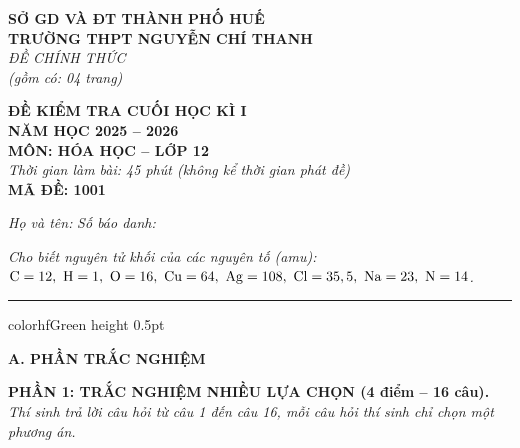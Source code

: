 \documentclass[11pt,a4paper]{article}
\begin{document}
\begin{minipage}[t]{0.48\textwidth}
\textbf{SỞ GD VÀ ĐT THÀNH PHỐ HUẾ}\\
\textbf{TRƯỜNG THPT NGUYỄN CHÍ THANH}\\
\textit{ĐỀ CHÍNH THỨC}\\
\textit{(gồm có: 04 trang)}
\end{minipage}
\hfill
\begin{minipage}[t]{0.48\textwidth}
\raggedleft
\textbf{\color{hfRed}ĐỀ KIỂM TRA CUỐI HỌC KÌ I}\\
\textbf{NĂM HỌC 2025 -- 2026}\\
\textbf{MÔN: HÓA HỌC -- LỚP 12}\\
\textit{Thời gian làm bài: 45 phút (không kể thời gian phát đề)}\\
\textbf{MÃ ĐỀ: 1001}
\end{minipage}

\vspace{4pt}
\noindent
\textit{Họ và tên:} \dotfill \textit{Số báo danh:} \dotfill

\vspace{3pt}
\noindent
\textit{\footnotesize Cho biết nguyên tử khối của các nguyên tố (amu): $\ce{C}=12,\ \ce{H}=1,\ \ce{O}=16,\ \ce{Cu}=64,\ \ce{Ag}=108,\ \ce{Cl}=35,5,\ \ce{Na}=23,\ \ce{N}=14$.}

\vspace{3pt}
\hrule color{hfGreen} height 0.5pt

\vspace{4pt}
\noindent
{\color{mainGreen}\textbf{\Large A. PHẦN TRẮC NGHIỆM}}

\vspace{3pt}
\noindent
{\color{mainGreen}\textbf{\large PHẦN 1: TRẮC NGHIỆM NHIỀU LỰA CHỌN (4 điểm – 16 câu).}}\\
\textit{\small Thí sinh trả lời câu hỏi từ câu 1 đến câu 16, mỗi câu hỏi thí sinh chỉ chọn một phương án.}
\vspace{2pt}
\end{document}
